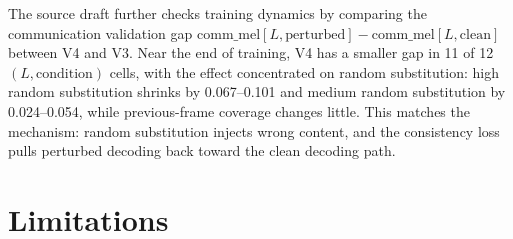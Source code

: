 ﻿\documentclass[conference]{IEEEtran}
\begin{document}
\begin{table}[t]
\centering
\caption{Paired marginal contribution tests for LCA components.}
\label{tab:ablation_tests}
\small
{}
\end{table}

The source draft further checks training dynamics by comparing the communication validation gap \( \mathrm{comm\_mel}[L,\mathrm{perturbed}]-\mathrm{comm\_mel}[L,\mathrm{clean}] \) between V4 and V3. Near the end of training, V4 has a smaller gap in 11 of 12 \((L,\mathrm{condition})\) cells, with the effect concentrated on random substitution: high random substitution shrinks by 0.067--0.101 and medium random substitution by 0.024--0.054, while previous-frame coverage changes little. This matches the mechanism: random substitution injects wrong content, and the consistency loss pulls perturbed decoding back toward the clean decoding path.

\section{Limitations}
\end{document}
